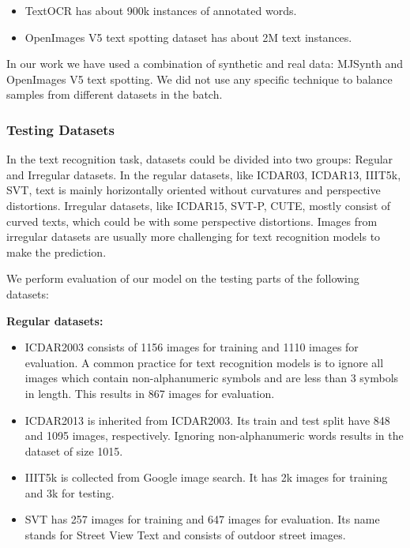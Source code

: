 \documentclass[runningheads]{llncs}
\begin{document}
\begin{itemize}
  \item TextOCR has about 900k instances of annotated words.
  \item OpenImages V5 text spotting dataset has about 2M text instances.
\end{itemize}

In our work we have used a combination of synthetic and real data: MJSynth and OpenImages V5 text spotting.
We did not use any specific technique to balance samples from different datasets in the batch.

\subsubsection{Testing Datasets}
In the text recognition task, datasets could be divided into two groups: Regular and Irregular datasets.
In the regular datasets, like ICDAR03, ICDAR13, IIIT5k, SVT, text is mainly horizontally oriented without
curvatures and perspective distortions. Irregular datasets, like ICDAR15, SVT-P, CUTE, mostly consist
of curved texts, which could be with some perspective distortions. Images from irregular datasets are
usually more challenging for text recognition models to make the prediction.

We perform evaluation of our model on the testing parts of the following datasets:

\textbf{Regular datasets:}
\begin{itemize}
  \item ICDAR2003 \cite{icdar03} consists of 1156 images for training and 1110 images for evaluation.
        A common practice for text recognition models is to ignore all images which contain non-alphanumeric
        symbols and are less than 3 symbols in length. This results in 867 images for evaluation.
  \item ICDAR2013 \cite{icdar13} is inherited from ICDAR2003. Its train and test split have
        848 and 1095 images, respectively. Ignoring non-alphanumeric words results in the dataset of
        size 1015.
  \item IIIT5k \cite{iiit5k} is collected from Google image search. It has 2k images for training
        and 3k for testing.
  \item SVT \cite{svt} has 257 images for training and 647 images for evaluation. Its name stands
        for Street View Text and consists of outdoor street images.
\end{itemize}
\end{document}
